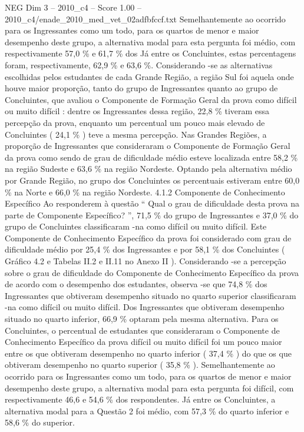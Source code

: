 \begin{textsample}{NEG Dim 3 – 2010\_c4 – Score 1.00 – 2010\_c4/enade\_2010\_med\_vet\_02adfbfccf.txt}
Semelhantemente ao ocorrido para os Ingressantes como um todo, para os quartos de menor e maior desempenho deste grupo, a alternativa modal para esta pergunta foi médio, com respectivamente 57,0 \% e 61,7 \% dos Já entre os Concluintes, estas percentagens foram, respectivamente, 62,9 \% e 63,6 \%.
Considerando -se as alternativas escolhidas pelos estudantes de cada Grande Região, a região Sul foi aquela onde houve maior proporção, tanto do grupo de Ingressantes quanto ao grupo de Concluintes, que avaliou o Componente de Formação Geral da prova como difícil ou muito difícil : dentre os Ingressantes dessa região, 22,8 \% tiveram essa percepção da prova, enquanto um percentual um pouco mais elevado de Concluintes ( 24,1 \% ) teve a mesma percepção.
Nas Grandes Regiões, a proporção de Ingressantes que consideraram o Componente de Formação Geral da prova como sendo de grau de dificuldade médio esteve localizada entre 58,2 \% na região Sudeste e 63,6 \% na região Nordeste.
Optando pela alternativa médio por Grande Região, no grupo dos Concluintes os percentuais estiveram entre 60,0 \% na Norte e 66,0 \% na região Nordeste. 4.1.2 Componente de Conhecimento Específico Ao responderem à questão “ Qual o grau de dificuldade desta prova na parte de Componente Específico? ”, 71,5 \% do grupo de Ingressantes e 37,0 \% do grupo de Concluintes classificaram -na como difícil ou muito difícil.
Este Componente de Conhecimento Específico da prova foi considerado com grau de dificuldade médio por 25,4 \% dos Ingressantes e por 58,1 \% dos Concluintes ( Gráfico 4.2 e Tabelas II.2 e II.11 no Anexo II ).
Considerando -se a percepção sobre o grau de dificuldade do Componente de Conhecimento Específico da prova de acordo com o desempenho dos estudantes, observa -se que 74,8 \% dos Ingressantes que obtiveram desempenho situado no quarto superior classificaram -na como difícil ou muito difícil.
Dos Ingressantes que obtiveram desempenho situado no quarto inferior, 66,9 \% optaram pela mesma alternativa.
Para os Concluintes, o percentual de estudantes que consideraram o Componente de Conhecimento Específico da prova difícil ou muito difícil foi um pouco maior entre os que obtiveram desempenho no quarto inferior ( 37,4 \% ) do que os que obtiveram desempenho no quarto superior ( 35,8 \% ).
Semelhantemente ao ocorrido para os Ingressantes como um todo, para os quartos de menor e maior desempenho deste grupo, a alternativa modal para esta pergunta foi difícil, com respectivamente 46,6 e 54,6 \% dos respondentes.
Já entre os Concluintes, a alternativa modal para a Questão 2 foi médio, com 57,3 \% do quarto inferior e 58,6 \% do superior.

\end{textsample}

